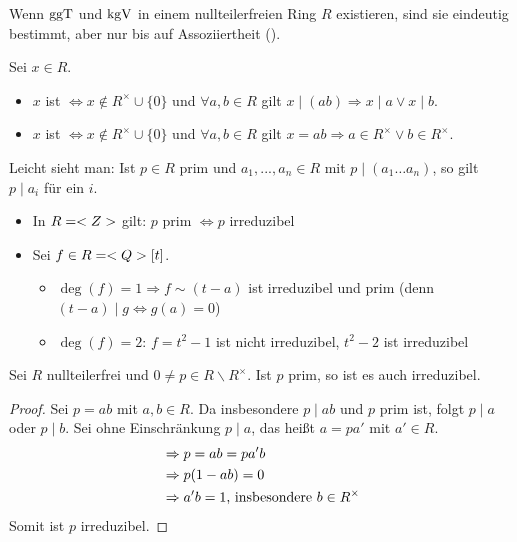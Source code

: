 \begin{remark}
	Wenn $\operatorname{ggT}$ und $\operatorname{kgV}$ in einem nullteilerfreien Ring $R$ existieren, sind sie eindeutig bestimmt, aber nur bis auf Assoziiertheit ().
\end{remark}

\begin{definition}
	Sei $x\in R$. 
	\begin{itemize}
		\item $x$ ist  $\iff x\notin R^\times\cup \{0\}$ und $\forall a,b\in R$ gilt $x\mid (ab)\Rightarrow x\mid a\lor x\mid b$.
		\item $x$ ist  $\iff x\notin R^\times\cup \{0\}$ und $\forall a,b\in R$ gilt $x=ab\Rightarrow a\in R^\times \lor b\in R^\times$.
	\end{itemize}
\end{definition}

\begin{remark}
	Leicht sieht man: Ist $p\in R$ prim und $a_1,...,a_n\in R$ mit $p\mid (a_1\dots a_n)$, so gilt $p\mid a_i$ für ein $i$.
\end{remark}

\begin{example}
	\begin{itemize}
		\item In $R=<Z>$ gilt: $p$ prim $\iff p$ irreduzibel
		\item Sei $f\in R=<Q>[t]$.
		\begin{itemize}
			\item $\deg(f)=1\Rightarrow f\sim (t-a)$ ist irreduzibel und prim (denn $(t-a)\mid g\iff g(a)=0$)
			\item $\deg(f)=2$: $f=t^2-1$ ist nicht irreduzibel, $t^2-2$ ist irreduzibel
		\end{itemize}
	\end{itemize}
\end{example}

\begin{proposition}
	Sei $R$ nullteilerfrei und $0\neq p\in R\backslash R^\times$. Ist $p$ prim, so ist es auch irreduzibel.
\end{proposition}
\begin{proof}
	Sei $p=ab$ mit $a,b\in R$. Da insbesondere $p\mid ab$ und $p$ prim ist, folgt $p\mid a$ oder $p\mid b$. Sei ohne Einschränkung $p\mid a$, das heißt $a=pa'$ mit $a'\in R$.
	\begin{align}
		&\Rightarrow p=ab = pa'b\notag \\
		&\Rightarrow p(1-ab) = 0\notag \\
		&\Rightarrow a'b=1\text{, insbesondere }b\in R^\times\notag
	\end{align}
	Somit ist $p$ irreduzibel.
\end{proof}


